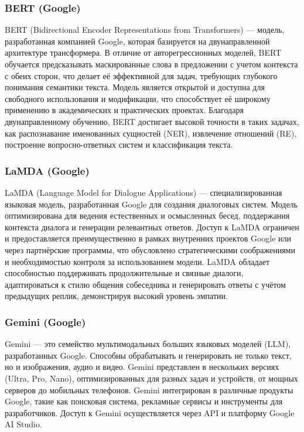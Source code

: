 \subsubsection{BERT (Google)}

BERT (Bidirectional Encoder Representations from Transformers) \cite{lib:bert}  — модель, разработанная компанией Google, которая базируется на двунаправленной архитектуре трансформера. В отличие от авторегрессионных моделей, BERT обучается предсказывать маскированные слова в предложении с учетом контекста с обеих сторон, что делает её эффективной для задач, требующих глубокого понимания семантики текста. Модель является открытой и доступна для свободного использования и модификации, что способствует её широкому применению в академических и практических проектах. Благодаря двунаправленному обучению, BERT достигает высокой точности в таких задачах, как распознавание именованных сущностей (NER), извлечение отношений (RE), построение вопросно-ответных систем и классификация текста.

\subsubsection{LaMDA (Google)}

LaMDA (Language Model for Dialogue Applications) \cite{lib:lambda} — специализированная языковая модель, разработанная Google для создания диалоговых систем. Модель оптимизирована для ведения естественных и осмысленных бесед, поддержания контекста диалога и генерации релевантных ответов. Доступ к LaMDA ограничен и предоставляется преимущественно в рамках внутренних проектов Google или через партнёрские программы, что обусловлено стратегическими соображениями и необходимостью контроля за использованием модели. LaMDA обладает способностью поддерживать продолжительные и связные диалоги, адаптироваться к стилю общения собеседника и генерировать ответы с учётом предыдущих реплик, демонстрируя высокий уровень эмпатии.

\subsubsection{Gemini (Google)}

Gemini \cite{lib:gemini} — это семейство мультимодальных больших языковых моделей (LLM), разработанных Google. Способны обрабатывать и генерировать не только текст, но и изображения, аудио и видео. Gemini представлен в нескольких версиях (Ultra, Pro, Nano), оптимизированных для разных задач и устройств, от мощных серверов до мобильных телефонов. Gemini интегрирован в различные продукты Google, такие как поисковая система, рекламные сервисы и инструменты для разработчиков. Доступ к Gemini осуществляется через API и платформу Google AI Studio.

